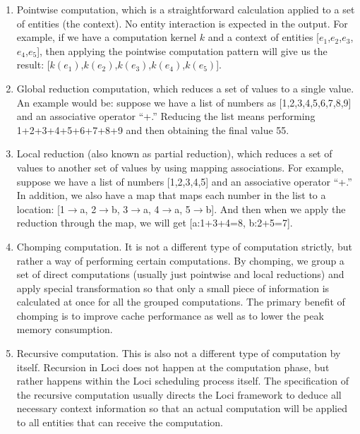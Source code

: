 \documentclass{article}
\begin{document}
\begin{enumerate}

  \item Pointwise computation, which is a straightforward calculation
    applied to a set of entities (the context).  No entity interaction
    is expected in the output.  For example, if we have a computation
    kernel $k$ and a context of entities [$e_1$,$e_2$,$e_3$,$e_4$,$e_5$],
    then applying the pointwise computation pattern will give us the
    result: [$k(e_1)$,$k(e_2)$,$k(e_3)$,$k(e_4)$,$k(e_5)$].  

  \item Global reduction computation, which reduces a set of values to a
    single value.  An example would be: suppose we have a list of
    numbers as [1,2,3,4,5,6,7,8,9] and an associative operator ``+.''
    Reducing the list means performing 1+2+3+4+5+6+7+8+9 and then
    obtaining the final value 55.  

  \item Local reduction (also known as partial reduction), which
    reduces a set of values to another set of values by using mapping
    associations.  For example, suppose we have a list of numbers
    [1,2,3,4,5] and an associative operator ``+.''  In addition, we also
    have a map that maps each number in the list to a location:
    [1$\to$a, 2$\to$b, 3$\to$a, 4$\to$a, 5$\to$b].  And then when we
    apply the reduction through the map, we will get [a:1+3+4=8,
    b:2+5=7].  

  \item Chomping computation.  It is not a different type of computation
    strictly, but rather a way of performing certain computations.  By
    chomping, we group a set of direct computations (usually just
    pointwise and local reductions) and apply special transformation so
    that only a small piece of information is calculated at once for all
    the grouped computations.  The primary benefit of chomping is to
    improve cache performance as well as to lower the peak memory
    consumption.  

  \item Recursive computation.  This is also not a different type of
    computation by itself.  Recursion in Loci does not happen at the
    computation phase, but rather happens within the Loci scheduling
    process itself.  The specification of the recursive computation
    usually directs the Loci framework to deduce all necessary context
    information so that an actual computation will be applied to all
    entities that can receive the computation.

\end{enumerate}
\end{document}
